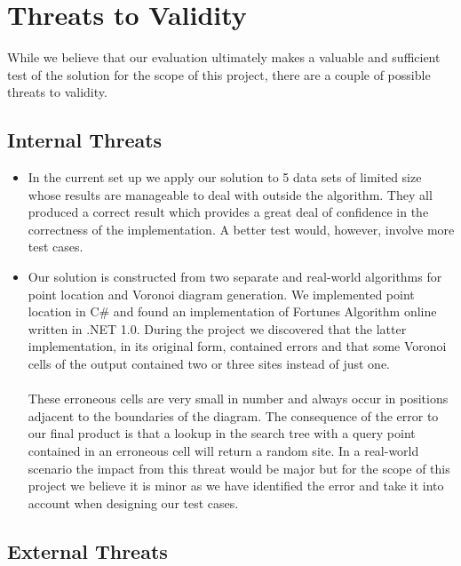 
\section{Threats to Validity}

While we believe that our evaluation ultimately makes a valuable and sufficient test of the solution for the scope of this project, there are a couple of possible threats to validity.

\subsection{Internal Threats}

\begin{itemize}
	\item In the current set up we apply our solution to 5 data sets of limited size whose results are manageable to deal with outside the algorithm. They all produced a correct result which provides a great deal of confidence in the correctness of the implementation. A better test would, however, involve more test cases.

	\item Our solution is constructed from two separate and real-world algorithms for point location and Voronoi diagram generation. We implemented point location in C\# and found an implementation of Fortunes Algorithm online written in .NET 1.0. During the project we discovered that the latter implementation, in its original form, contained errors and that some Voronoi cells of the output contained two or three sites instead of just one.

\paragraph{}
These erroneous cells are very small in number and always occur in positions adjacent to the boundaries of the diagram. The consequence of the error to our final product is that a lookup in the search tree with a query point contained in an erroneous cell will return a random site. In a real-world scenario the impact from this threat would be major but for the scope of this project we believe it is minor as we have identified the error and take it into account when designing our test cases.
\end{itemize}

\subsection{External Threats}

